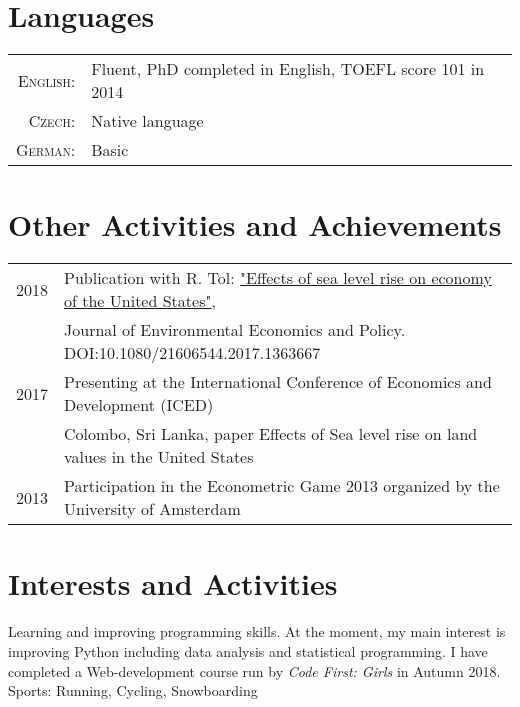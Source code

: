 \documentclass[a4paper,10pt]{article}
\begin{document}
\section{Languages}
\begin{tabular}{rl}
\textsc{English:}&Fluent, PhD completed in English, TOEFL score 101 in 2014\\
\textsc{Czech:}&Native language\\
\textsc{German:}&Basic\\
\end{tabular}


\section{Other Activities and Achievements}
\begin{tabular}{rl}
2018 & Publication with R. Tol:  \href{https://www.tandfonline.com/doi/full/10.1080/21606544.2017.1363667}{"Effects of sea level rise on economy of the United States"},\\
  &Journal of Environmental Economics and Policy. DOI:10.1080/21606544.2017.1363667\normalsize\\
 2017 & Presenting at the International Conference of Economics and Development (ICED)\normalsize\\
 &  Colombo, Sri Lanka, paper Effects of Sea level rise on land values in the United States\normalsize\\
 2013 & Participation in the Econometric Game 2013 organized by the University of Amsterdam
\end{tabular}

\section{Interests and Activities}
Learning and improving programming skills. At the moment, my main interest is improving Python including data analysis and statistical programming. I have completed a  Web-development course run by \textit{Code First: Girls} in Autumn 2018.
\vspace{0.15cm} \\
Sports: Running, Cycling, Snowboarding
\vspace{0.5cm}

\end{document}

